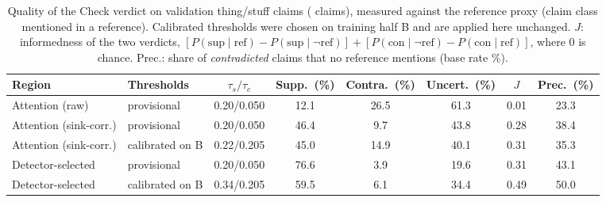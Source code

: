 \begin{table}[t]
\caption{Quality of the Check verdict on validation thing/stuff claims (\NumCheckClaims{} claims), measured against the
reference proxy (claim class mentioned in a reference). Calibrated thresholds were chosen on training half B
and are applied here unchanged. $J$: informedness of the two verdicts,
$[P(\mathrm{sup}\mid\mathrm{ref})-P(\mathrm{sup}\mid\neg\mathrm{ref})]+[P(\mathrm{con}\mid\neg\mathrm{ref})-P(\mathrm{con}\mid\mathrm{ref})]$,
where 0 is chance. Prec.: share of \emph{contradicted} claims that no reference mentions (base rate \UnsupBaseRate\%).}
\label{tab:check}
\centering\footnotesize
\begin{tabular}{@{}llcccccc@{}}
\toprule
Region & Thresholds & $\tau_s/\tau_c$ & Supp.\ (\%) & Contra.\ (\%) & Uncert.\ (\%) & $J$ & Prec.\ (\%) \\
\midrule
Attention (raw) & provisional & 0.20/0.050 & 12.1 & 26.5 & 61.3 & 0.01 & 23.3 \\
\addlinespace
Attention (sink-corr.) & provisional & 0.20/0.050 & 46.4 & 9.7 & 43.8 & 0.28 & 38.4 \\
Attention (sink-corr.) & calibrated on B & 0.22/0.205 & 45.0 & 14.9 & 40.1 & 0.31 & 35.3 \\
\addlinespace
Detector-selected & provisional & 0.20/0.050 & 76.6 & 3.9 & 19.6 & 0.31 & 43.1 \\
Detector-selected & calibrated on B & 0.34/0.205 & 59.5 & 6.1 & 34.4 & 0.49 & 50.0 \\
\bottomrule
\end{tabular}
\end{table}
